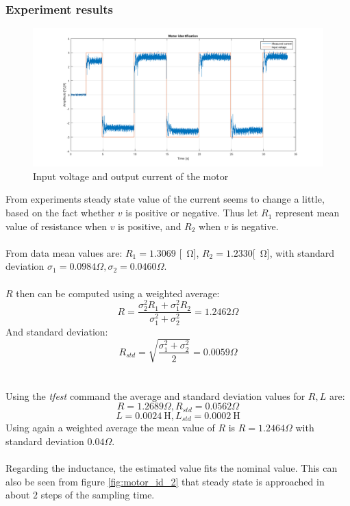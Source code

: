 \subsubsection{Experiment results}
\begin{figure}[!h]
    \centering
    \includegraphics[width=1\textwidth]{img/motor_id_1.png}
    \caption{Input voltage and output current of the motor}
    \label{fig:motor_id_1}
\end{figure}
From experiments steady state value of the current seems to change a little, based on the fact whether $v$ is positive or negative.
Thus let $R_1$ represent mean value of resistance when $v$ is positive, and $R_2$ when $v$ is negative.\\ \\
From data  mean values are: $R_1 =1.3069	$ [\SI{}{\ohm}], $R_2=1.2330$[\SI{}{\ohm}], with standard deviation $\sigma_1= 0.0984 \Omega, \sigma_2=0.0460 \Omega
$. \\ \\
$R$ then can be computed using a weighted average:
$$R = \frac{\sigma_2^2 R_1 + \sigma_1^2 R_2}{\sigma_1^2+\sigma_2^2} = 1.2462 \Omega$$
And standard deviation:
$$R_{std} = \sqrt{\frac{\sigma_1^2+\sigma_2^2}{2} }=0.0059 \Omega$$
\\ \\
Using the \emph{tfest} command the average and standard deviation values for $R,L$ are:
$$
R = 1.2689 \Omega, R_{std} = 0.0562 \Omega$$
$$
L = 0.0024 \SI{}{\henry}, L_{std} = 0.0002 \SI{}{\henry}$$
Using again a weighted average the mean value of $R$ is $R=1.2464 \Omega$ with standard deviation $0.04 \Omega$. \\ \\
Regarding the inductance, the estimated value fits the nominal value. This can also be seen from figure \ref{fig:motor_id_2} that  steady state is approached in about $2$ steps of the sampling time.\\

